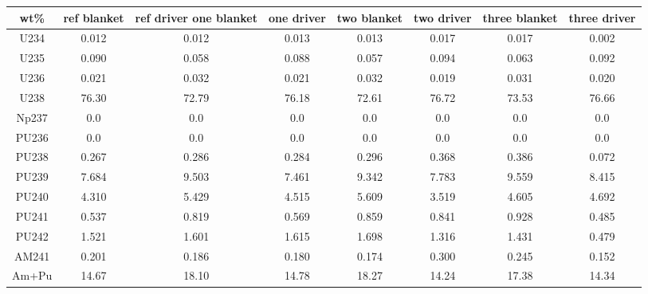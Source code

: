 	\begin{tabular}{cccccccc}
		\hline
		\textbf{wt\%} & \textbf{ref blanket} & \textbf{ref driver} \textbf{one blanket} & \textbf{one driver} & \textbf{two blanket} & \textbf{two driver} & \textbf{three blanket} & \textbf{three driver} \\ 
		\hline
		U234 & 0.012 & 0.012 & 0.013 & 0.013 & 0.017 & 0.017 & 0.002 \\ 
		U235 & 0.090 & 0.058 & 0.088 & 0.057 & 0.094 & 0.063 & 0.092 \\ 
		U236 & 0.021 & 0.032 & 0.021 & 0.032 & 0.019 & 0.031 & 0.020 \\ 
		U238 & 76.30 & 72.79 & 76.18 & 72.61 & 76.72 & 73.53 & 76.66 \\ 
		Np237 & 0.0 & 0.0 & 0.0 & 0.0 & 0.0 & 0.0 & 0.0 \\ 
		PU236 & 0.0 & 0.0 & 0.0 & 0.0 & 0.0 & 0.0 & 0.0 \\ 
		PU238 & 0.267 & 0.286 & 0.284 & 0.296 & 0.368 & 0.386 & 0.072 \\ 
		PU239 & 7.684 & 9.503 & 7.461 & 9.342 & 7.783 & 9.559 & 8.415 \\ 
		PU240 & 4.310 & 5.429 & 4.515 & 5.609 & 3.519 & 4.605 & 4.692 \\ 
		PU241 & 0.537 & 0.819 & 0.569 & 0.859 & 0.841 & 0.928 & 0.485 \\ 
		PU242 & 1.521 & 1.601 & 1.615 & 1.698 & 1.316 & 1.431 & 0.479 \\ 
		AM241 & 0.201 & 0.186 & 0.180 & 0.174 & 0.300 & 0.245 & 0.152 \\ 
		Am+Pu & 14.67 & 18.10 & 14.78 & 18.27 & 14.24 & 17.38 & 14.34 \\ 
		\hline 
	\end{tabular} 
